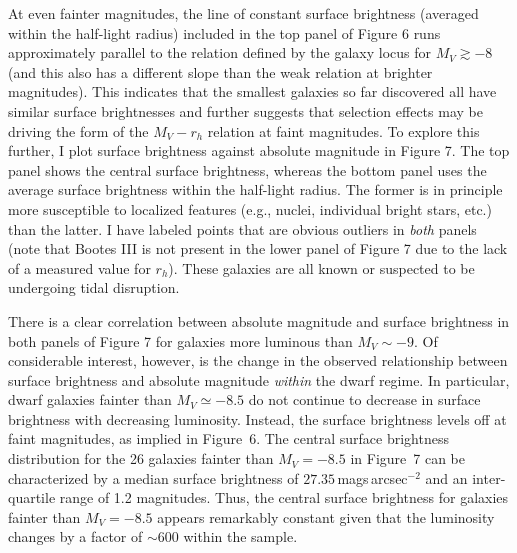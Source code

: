 \documentclass[manuscript]{aastex}
\begin{document}
At even fainter magnitudes, the line of constant surface brightness
(averaged within the half-light radius) included in the top panel of
Figure 6 runs approximately parallel to the relation defined by the
galaxy locus for $M_V \gtrsim -8$ (and this also has a different slope
than the weak relation at brighter magnitudes). This indicates that
the smallest galaxies so far discovered all have similar surface
brightnesses and further suggests that selection effects may be
driving the form of the $M_V - r_h$ relation at faint magnitudes. To
explore this further, I plot surface brightness against absolute
magnitude in Figure 7. The top panel shows the central surface
brightness, whereas the bottom panel uses the average surface
brightness within the half-light radius. The former is in principle
more susceptible to localized features (e.g., nuclei, individual
bright stars, etc.) than the latter. I have labeled points that are
obvious outliers in {\it both} panels (note that Bootes III is not
present in the lower panel of Figure 7 due to the lack of a measured
value for $r_h$). These galaxies are all known or suspected to be
undergoing tidal disruption.

There is a clear correlation between absolute magnitude and
surface brightness in both panels of Figure 7 for galaxies more
luminous than $M_V \sim -9$. Of considerable interest, however, is
the change in the observed relationship between surface brightness and
absolute magnitude {\it within} the dwarf regime. In particular, dwarf
galaxies fainter than $M_V \simeq -8.5$ do not continue to decrease in
surface brightness with decreasing luminosity. Instead, the surface
brightness levels off at faint magnitudes, as implied in Figure~6. The
central surface brightness distribution for the 26 galaxies fainter
than $M_V = -8.5$ in Figure~7 can be characterized by a median surface brightness
of $27.35$\,mags\,arcsec$^{-2}$ and an inter-quartile range of 1.2
magnitudes. Thus, the central surface brightness for galaxies fainter
than $M_V = -8.5$ appears remarkably constant given that the
luminosity changes by a factor of $\sim 600$ within the sample.
\end{document}
